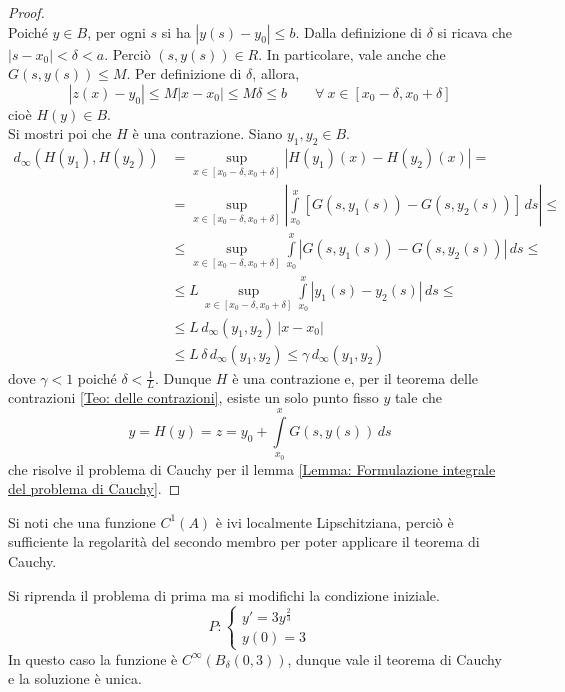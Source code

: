 \begin{proof}
\begin{equation}
\end{equation}
Poiché $y \in B$, per ogni $s$ si ha $|y(s)-y_0|\leq b$. Dalla definizione di $\delta$ si ricava che $|s-x_0|<\delta<a$. Perciò $(s, y(s)) \in R$. In particolare, vale anche che $G(s, y(s)) \leq M$. Per definizione di $\delta$, allora,
\begin{equation}
    |z(x)-y_0|\leq M|x-x_0|\leq M\delta \leq b \qquad \forall\ x \in [x_0-\delta, x_0+\delta]
\end{equation}
cioè $H(y) \in B$.\\
Si mostri poi che $H$ è una contrazione. Siano $y_1, y_2 \in B$.
\begin{equation}
\begin{aligned}
    d_\infty(H(y_1), H(y_2))&= \sup_{x \in [x_0-\delta, x_0+\delta]}{|H(y_1)(x)-H(y_2)(x)|}=\\
    &=\sup_{x \in [x_0-\delta, x_0+\delta]}\left|{\int\limits_{x_0}^{x}{\left[G(s,y_1(s))-G(s, y_2(s))\right]}}\,ds\right| \leq \\
    &\leq \sup_{x \in [x_0-\delta, x_0+\delta]}{\int\limits_{x_0}^{x}{\left|G(s,y_1(s))-G(s, y_2(s))\right|}}\,ds \leq\\
    &\leq L\,  \sup_{x \in [x_0-\delta, x_0+\delta]}{\int\limits_{x_0}^{x}{\left|y_1(s)-y_2(s)\right|}}\,ds\leq\\
    &\leq L \,d_\infty(y_1, y_2)\, |x-x_0| \\
    &\leq L\, \delta\, d_\infty(y_1, y_2) \leq \gamma\, d_\infty(y_1,y_2)
\end{aligned}
\end{equation}
dove $\gamma<1$ poiché $\delta<\tfrac{1}{L}$. Dunque $H$ è una contrazione e, per il teorema delle contrazioni \eqref{Teo: delle contrazioni}, esiste un solo punto fisso $y$ tale che
\begin{equation}
    y=H(y)=z= y_0+ \int\limits_{x_0}^{x}{G(s, y(s))}\,ds
\end{equation}
che risolve il problema di Cauchy per il lemma \ref{Lemma: Formulazione integrale del problema di Cauchy}.
\end{proof}
\begin{oss}
    Si noti che una funzione $C^1(A)$ è ivi localmente Lipschitziana, perciò  è sufficiente la regolarità del secondo membro per poter applicare il teorema di Cauchy.
\end{oss}
\begin{example}
    Si riprenda il problema di prima ma si modifichi la condizione iniziale.
    \begin{equation*}
        P: \begin{cases}
        y'=3y^{\frac{2}{3}}\\
        y(0)=3
    \end{cases}
    \end{equation*}
    In questo caso la funzione è $C^\infty(B_\delta(0,3))$, dunque vale il teorema di Cauchy e la soluzione è unica.
\end{example}

